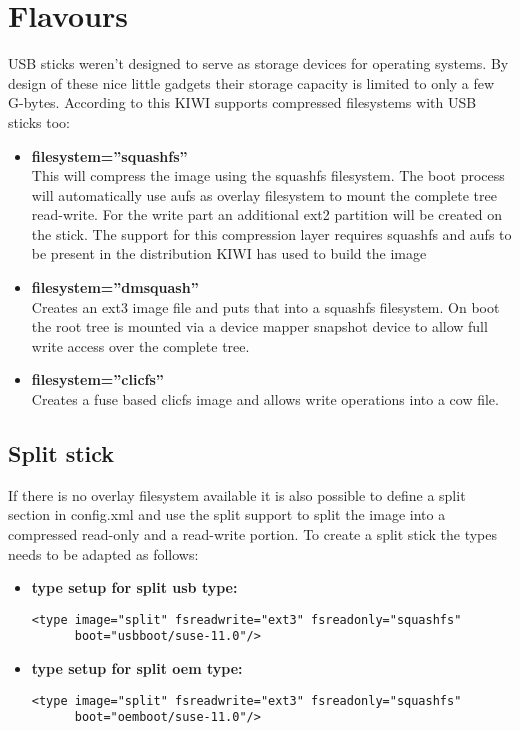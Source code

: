 \section{Flavours}

USB sticks weren't designed to serve as storage devices for
operating systems. By design of these nice little gadgets their
storage capacity is limited to only a few G-bytes. According to
this KIWI supports compressed filesystems with USB sticks too:  

\begin{itemize}
\item \textbf{filesystem=''squashfs''}\\
      This will compress the image using the squashfs filesystem. The
      boot process will automatically use aufs as overlay filesystem to
      mount the complete tree read-write. For the write part an additional
      ext2 partition will be created on the stick. The support for this
      compression layer requires squashfs and aufs to be present in
      the distribution KIWI has used to build the image 
\item \textbf{filesystem=''dmsquash''}\\
      Creates an ext3 image file and puts that
      into a squashfs filesystem. On boot the root tree is mounted
      via a device mapper snapshot device to allow full write
      access over the complete tree.
\item \textbf{filesystem=''clicfs''}\\
      Creates a fuse based clicfs image and allows write operations
      into a cow file.
\end{itemize}

\subsection{Split stick}
If there is no overlay filesystem available it is also possible to
define a split section in config.xml and use the split support to
split the image into a compressed read-only and a read-write portion.
To create a split stick the types needs to be adapted as follows:

\begin{itemize}
\item \textbf{type setup for split usb type:}

      \begin{Command}{12cm}
      \begin{verbatim}
<type image="split" fsreadwrite="ext3" fsreadonly="squashfs"
      boot="usbboot/suse-11.0"/>
      \end{verbatim}
      \end{Command}
\item \textbf{type setup for split oem type:}

      \begin{Command}{12cm}
      \begin{verbatim}
<type image="split" fsreadwrite="ext3" fsreadonly="squashfs"
      boot="oemboot/suse-11.0"/>
      \end{verbatim}
      \end{Command}
\end{itemize}

